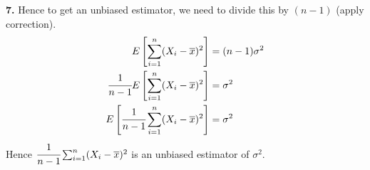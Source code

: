 \textbf{7. } Hence to get an unbiased estimator, we need to divide this by $(n-1)$ (apply correction).
\[\begin{split}
		E\left[ \sum_{i = 1}^n ( X_i - \overline{x} )^2 \right] &= (n - 1) \sigma^2\\
		\cfrac{1}{n-1} E\left[ \sum_{i = 1}^n ( X_i - \overline{x} )^2 \right] &= \sigma^2 \\
		E\left[\cfrac{1}{n-1} \sum_{i = 1}^n ( X_i - \overline{x} )^2 \right] &= \sigma^2 \\
	\end{split}\]
Hence $\cfrac{1}{n-1} \sum_{i = 1}^n ( X_i - \overline{x} )^2 $ is an unbiased estimator of $\sigma^2$.
